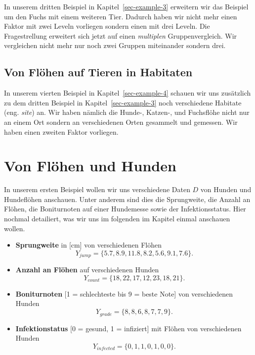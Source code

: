 \documentclass[
  letterpaper,
  DIV=11,
  oneside]{scrreport}
\begin{document}
In unserem dritten Beispiel in Kapitel~\ref{sec-example-3} erweitern wir
das Beispiel um den Fuchs mit einem weiteren Tier. Dadurch haben wir
nicht mehr einen Faktor mit zwei Leveln vorliegen sondern einen mit drei
Leveln. Die Fragestrellung erweitert sich jetzt auf einen
\emph{multiplen} Gruppenvergleich. Wir vergleichen nicht mehr nur noch
zwei Gruppen miteinander sondern drei.

\hypertarget{von-fluxf6hen-auf-tieren-in-habitaten}{%
\section*{Von Flöhen auf Tieren in
Habitaten}\label{von-fluxf6hen-auf-tieren-in-habitaten}}

In unserem vierten Beispiel in Kapitel~\ref{sec-example-4} schauen wir
uns zusätzlich zu dem dritten Beispiel in Kapitel~\ref{sec-example-3}
noch verschiedene Habitate (eng. \emph{site}) an. Wir haben nämlich die
Hunde-, Katzen-, und Fuchsflöhe nicht nur an einem Ort sondern an
verschiedenen Orten gesammelt und gemessen. Wir haben einen zweiten
Faktor vorliegen.

\hypertarget{sec-example-1}{%
\chapter{Von Flöhen und Hunden}\label{sec-example-1}}

In unserem ersten Beispiel wollen wir uns verschiedene Daten \(D\) von
Hunden und Hundeflöhen anschauen. Unter anderem sind dies die
Sprungweite, die Anzahl an Flöhen, die Boniturnoten auf einer Hundemesse
sowie der Infektionsstatus. Hier nochmal detailiert, was wir uns im
folgenden im Kapitel einmal anschauen wollen.

\begin{itemize}
\item
  \textbf{Sprungweite} in {[}cm{]} von verschiedenen Flöhen \[
  Y_{jump} = \{5.7, 8.9, 11.8, 8.2, 5.6, 9.1, 7.6\}.
  \]
\item
  \textbf{Anzahl an Flöhen} auf verschiedenen Hunden \[
    Y_{count} = \{18, 22, 17, 12, 23, 18, 21\}.
    \]
\item
  \textbf{Boniturnoten} {[}1 = schlechteste bis 9 = beste Note{]} von
  verschiedenen Hunden \[
    Y_{grade} = \{8, 8, 6, 8, 7, 7, 9\}.
    \]
\item
  \textbf{Infektionstatus} {[}0 = gesund, 1 = infiziert{]} mit Flöhen
  von verschiedenen Hunden \[
    Y_{infected} = \{0, 1, 1, 0, 1, 0, 0\}.
    \]
\end{itemize}
\end{document}
